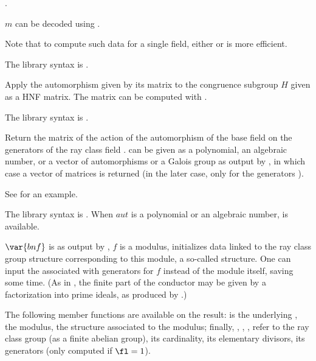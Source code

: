 .

\noindent $m$ can be decoded using .

Note that to compute such data for a single field, either 
or  is more efficient.

The library syntax is .

\label{se:bnrgaloisapply}
Apply the automorphism given by its matrix  to the congruence
subgroup $H$ given as a HNF matrix.
The matrix  can be computed with .

The library syntax is .

\label{se:bnrgaloismatrix}
Return the matrix of the action of the automorphism  of the base
field  on the generators of the ray class field .
 can be given as a polynomial, an algebraic number, or a vector of
automorphisms or a Galois group as output by , in which case a
vector of matrices is returned (in the later case, only for the generators
).

See  for an example.

The library syntax is .
When $aut$ is a polynomial or an algebraic number,
 is available.

\label{se:bnrinit}
$\var{bnf}$ is as
output by , $f$ is a modulus, initializes data linked to
the ray class group structure corresponding to this module, a so-called
 structure. One can input the associated  with generators
for $f$ instead of the module itself, saving some time.
(As in , the finite part of the conductor may be given
by a factorization into prime ideals, as produced by .)

The following member functions are available
on the result:  is the underlying ,
 the modulus,  the  structure associated to the
modulus; finally, , , ,  refer to the
ray class group (as a finite abelian group), its cardinality, its elementary
divisors, its generators (only computed if $\fl = 1$).

